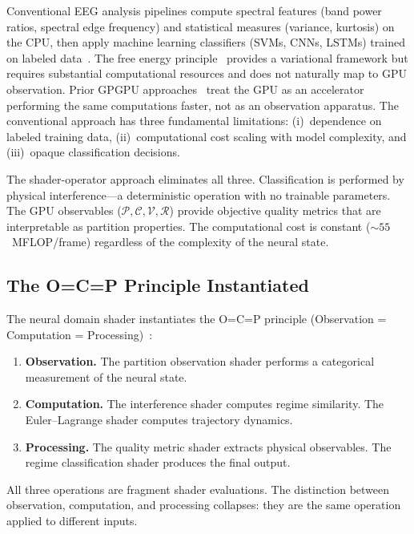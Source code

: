 \documentclass[11pt,twocolumn,a4paper]{article}
\begin{document}
Conventional EEG analysis pipelines compute spectral features (band power ratios, spectral edge frequency) and statistical measures (variance, kurtosis) on the CPU, then apply machine learning classifiers (SVMs, CNNs, LSTMs) trained on labeled data~\cite{delorme2004,nunez2006}.
The free energy principle~\cite{friston2010,friston2006} provides a variational framework but requires substantial computational resources and does not naturally map to GPU observation.
Prior GPGPU approaches~\cite{owens2008,nickolls2008,harris2002} treat the GPU as an accelerator performing the same computations faster, not as an observation apparatus.
The conventional approach has three fundamental limitations: (i)~dependence on labeled training data, (ii)~computational cost scaling with model complexity, and (iii)~opaque classification decisions.

The shader-operator approach eliminates all three.
Classification is performed by physical interference---a deterministic operation with no trainable parameters.
The GPU observables ($\mathcal{P}, \mathcal{C}, \mathcal{V}, \mathcal{R}$) provide objective quality metrics that are interpretable as partition properties.
The computational cost is constant ($\sim\!55$~MFLOP/frame) regardless of the complexity of the neural state.

\subsection{The O=C=P Principle Instantiated}

The neural domain shader instantiates the O=C=P principle (Observation = Computation = Processing)~\cite{sachikonye2026gpu}:

\begin{enumerate}[leftmargin=*,itemsep=1pt]
\item \textbf{Observation.} The partition observation shader performs a categorical measurement of the neural state.
\item \textbf{Computation.} The interference shader computes regime similarity.
The Euler--Lagrange shader computes trajectory dynamics.
\item \textbf{Processing.} The quality metric shader extracts physical observables.
The regime classification shader produces the final output.
\end{enumerate}

All three operations are fragment shader evaluations.
The distinction between observation, computation, and processing collapses: they are the same operation applied to different inputs.
\end{document}
